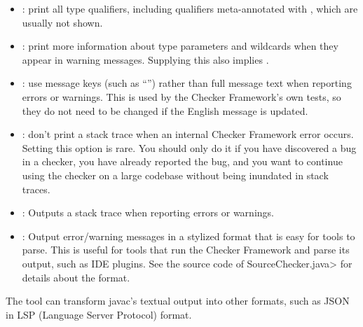\begin{itemize}
\item {}: print all type qualifiers, including
qualifiers meta-annotated with , which are
usually not shown.

\item {}: print more information about type
  parameters and wildcards when they appear in warning messages.  Supplying
  this also implies .

\item {}: use message keys (such as ``'')
rather than full message text when reporting errors or warnings.  This is
used by the Checker Framework's own tests, so they do not need to be
changed if the English message is updated.

\item {}: don't print a stack trace when an
internal Checker Framework error occurs.  Setting this option is rare.  You
should only do it if you have discovered a bug in a checker, you have
already reported the bug, and you want to continue using the checker on a
large codebase without being inundated in stack traces.

\item {}: Outputs a stack trace when reporting errors or warnings.

\end{itemize}



\begin{itemize}

\item {}: Output error/warning messages in a
  stylized format that is easy for tools to parse.  This is useful for
  tools that run the Checker Framework and parse its output, such as IDE
  plugins.  See the source code of \<SourceChecker.java> for details about
  the format.

\end{itemize}

The
tool can transform javac's textual output into other formats, such as JSON
in LSP (Language Server Protocol) format.



